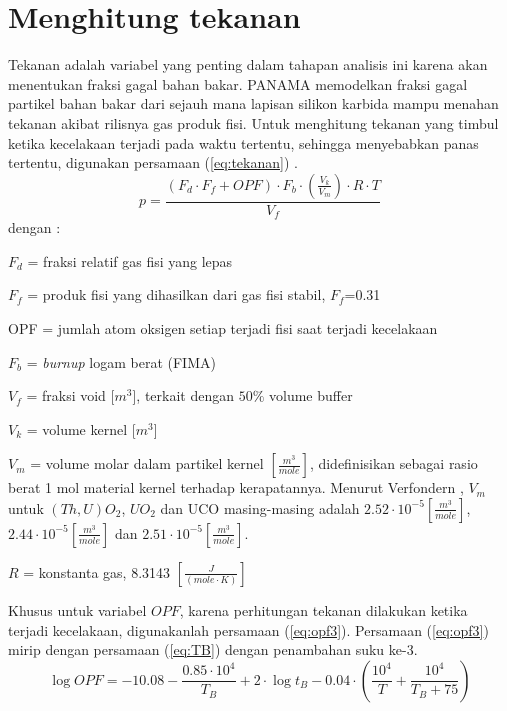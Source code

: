 \documentclass[a4paper,11pt]{report}
\begin{document}

\section{Menghitung tekanan}
Tekanan adalah variabel yang penting dalam tahapan analisis ini karena akan menentukan fraksi gagal bahan bakar. PANAMA \cite{report1} memodelkan fraksi gagal partikel bahan bakar dari sejauh mana lapisan silikon karbida mampu menahan tekanan akibat rilisnya gas produk fisi. Untuk menghitung tekanan yang timbul ketika kecelakaan terjadi pada waktu tertentu, sehingga menyebabkan panas tertentu, digunakan persamaan (\ref{eq:tekanan}) \cite{report1}. 
\begin{equation}
  p=\frac{(F_d \cdot F_f + OPF) \cdot F_b \cdot (\frac{V_k}{V_m}) \cdot R \cdot T}{ V_f}
  \label{eq:tekanan}
\end{equation}
dengan :
\begin{description}
  \item $F_d$ = fraksi relatif gas fisi yang lepas 
  \item $F_f$ = produk fisi yang dihasilkan dari gas fisi stabil, $F_f$=0.31
  \item OPF = jumlah atom oksigen setiap terjadi fisi saat terjadi kecelakaan
  \item $F_b$ = \textit{burnup} logam berat (FIMA)
  \item $V_f$ = fraksi void [$m^3$], terkait dengan $50\%$ volume buffer 
  \item $V_k$ = volume kernel [$m^3$]
  \item $V_m$ = volume molar dalam partikel kernel $\left[\frac{m^3}{mole} \right]$, didefinisikan sebagai rasio berat 1 mol material kernel terhadap kerapatannya. Menurut Verfondern \cite{report1}, $V_m$ untuk $(Th,U)O_2$, $UO_2$ dan UCO masing-masing adalah $2.52 \cdot 10^{-5}[\frac{m^3}{mole}]$, $2.44 \cdot 10^{-5}[\frac{m^3}{mole}]$ dan $2.51 \cdot 10^{-5}[\frac{m^3}{mole}]$.
  \item $R$ = konstanta gas, 8.3143 $\left[\frac{J}{(mole \cdot K)} \right]$
\end{description}

Khusus untuk variabel $OPF$, karena perhitungan tekanan dilakukan ketika terjadi kecelakaan, digunakanlah persamaan (\ref{eq:opf3}). Persamaan (\ref{eq:opf3}) mirip dengan persamaan (\ref{eq:TB}) dengan penambahan suku ke-3.
\begin{equation}
  \log OPF=-10.08-\frac{0.85 \cdot 10^4}{T_B} + 2 \cdot \log t_B - 0.04 \cdot \left( \frac{10^4}{T} + \frac{10^4}{T_B + 75} \right)
  \label{eq:opf3}
\end{equation}
\end{document}
